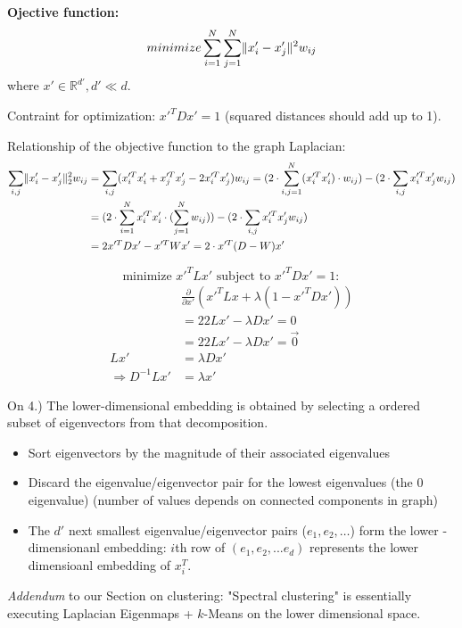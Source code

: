 \documentclass{scrartcl}
\DeclarePairedDelimiter\norm{\lVert}{\rVert}%
\begin{document}
\textbf{Ojective function:}
\[minimize \sum_{i=1}^{N}\sum_{j=1}^{N}\norm{x_i'- x_j'}^2 w_{ij}\]
where \(x'\in \mathbb{R}^{d'}, d' \ll d\).

Contraint for optimization: \(x'^T D x' = 1\) (squared distances should add up to 1).

Relationship of the objective function to the graph Laplacian:
\begin{align*}
    \sum_{i,j} \norm{x_i' - x_j'}_2^2 w_{ij} &= \sum_{i,j} (x_i'^T x_i' + x_j'^T x_j' - 2 x_i'^T x_j') w_{ij} = (2\cdot \sum_{i,j=1}^N(x_i'^T x_i') \cdot w_{ij}) - (2 \cdot \sum_{i,j} x_i'^T x_j' w_{ij})\\
    &= (2 \cdot \sum_{i=1}^N x_i'^T x_i' \cdot (\sum_{j=1}^N w_{ij}))- (2 \cdot \sum_{i,j} x_i'^T x_j' w_{ij})\\
    &= 2 x'^T D x' - x'^TWx' = 2 \cdot x'^T (D-W) x'
\end{align*}

\[\text{minimize } x'^T L x' \text{ subject to } x'^T D x' = 1:\]
\begin{align*}
    &\frac{\partial}{\partial x'} (x'^T L x + \lambda (1-x'^T D x'))\\
    &= 2 2 L x' - \lambda D x' = 0\\
    &= 2 2 L x' - \lambda D x' = \vec{0}\\
    Lx' &= \lambda D x'\\
    \Rightarrow D^{-1} L x' &= \lambda x'
\end{align*}

On 4.) The lower-dimensional embedding is obtained by selecting a ordered subset of eigenvectors from that decomposition.
\begin{itemize}
    \item
        Sort eigenvectors by the magnitude of their associated eigenvalues 
    \item
        Discard the eigenvalue/eigenvector pair for the lowest eigenvalues (the 0 eigenvalue) (number of values depends on connected components in graph)
    \item
        The \(d'\) next smallest eigenvalue/eigenvector pairs (\(e_1, e_2, \dots\)) form the lower -dimensionanl embedding: \(i\)th row of \((e_1, e_2, ... e_d)\) represents the lower dimensioanl embedding of \(x_i^T\).
\end{itemize}

\textit{Addendum} to our Section on clustering: "Spectral clustering" is essentially executing Laplacian Eigenmaps + \(k\)-Means on the lower dimensional space.
\end{document}
